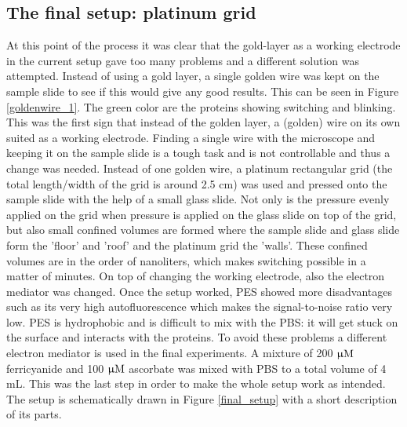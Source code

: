 \documentclass[twoside,single]{lion-msc}
\begin{document}
\subsection*{The final setup: platinum grid} \label{grid_1}
At this point of the process it was clear that the gold-layer as a working electrode in the current setup gave too many problems and a different solution was attempted. Instead of using a gold layer, a single golden wire was kept on the sample slide to see if this would give any good results. This can be seen in Figure \ref{goldenwire_1}. The green color are the proteins showing switching and blinking. This was the first sign that instead of the golden layer, a (golden) wire on its own suited as a working electrode. Finding a single wire with the microscope and keeping it on the sample slide is a tough task and is not controllable and thus a change was needed. Instead of one golden wire, a platinum rectangular grid (the total length/width of the grid is around 2.5 cm) was used and pressed onto the sample slide with the help of a small glass slide. Not only is the pressure evenly applied on the grid when pressure is applied on the glass slide on top of the grid, but also small confined volumes are formed where the sample slide and glass slide form the 'floor' and 'roof' and the platinum grid the 'walls'. These confined volumes are in the order of nanoliters, which makes switching possible in a matter of minutes. On top of changing the working electrode, also the electron mediator was changed. Once the setup worked, PES showed more disadvantages such as its very high autofluorescence which makes the signal-to-noise ratio very low. PES is hydrophobic and is difficult to mix with the PBS: it will get stuck on the surface and interacts with the proteins. To avoid these problems a different electron mediator is used in the final experiments. A mixture of 200 $\upmu \textup{M}$ ferricyanide and 100 $\upmu \textup{M}$ ascorbate was mixed with PBS to a total volume of 4 mL. This was the last step in order to make the whole setup work as intended. The setup is schematically drawn in Figure \ref{final_setup} with a short description of its parts.
\end{document}
